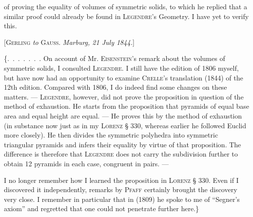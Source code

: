%
\noindent of proving the equality of volumes of symmetric solids, to which he replied that a similar proof could already be found in \textsc{Legendre}'s Geometry. I have yet to verify this.

\begin{center}
[\textsc{Gerling} \emph{to} \textsc{Gauss}. \emph{Marburg, 21 July 1844.}]
\end{center}

\{\mbox{.\ .\ .\ .\ .\ .\ .} On account of Mr. \textsc{Eisenstein}'s remark about the volumes of symmetric solids, I consulted \textsc{Legendre}. I still have the edition of 1806 myself, but have now had an opportunity to examine \textsc{Crelle}'s translation (1844) of the 12th edition. Compared with 1806, I do indeed find some changes on these matters. --- \textsc{Legendre}, however, did not prove the proposition in question  of the method of exhaustion. He starts from the proposition that pyramids of equal base area and equal height are equal. --- He proves this by the method of exhaustion (in substance now just as in my \textsc{Lorenz} § 330, whereas earlier he followed Euclid more closely). He then divides the symmetric polyhedra into symmetric triangular pyramids and infers their equality by virtue of that proposition. The difference is therefore that \textsc{Legendre} does not carry the subdivision further to obtain 12 pyramids in each case, congruent in pairs. ---

I no longer remember how I learned the proposition in \textsc{Lorenz} § 330. Even if I discovered it independently, remarks by \textsc{Pfaff} certainly brought the discovery very close. I remember in particular that in (1809) he spoke to me of “Segner's axiom” and regretted that one could not penetrate further here.\}
